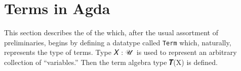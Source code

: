 \documentclass[a4paper,UKenglish,cleveref, autoref, thm-restate]{lipics-v2019}
\begin{document}

\section{Terms in Agda}\label{sec:terms-in-agda}
This section describes the \termsmodule of the \agdaualib which, after the usual assortment of preliminaries, begins by defining
a datatype called \texttt{Term} which, naturally, represents the type of terms. Type \ab 𝑋 : \ab 𝒰 ̇ is used to represent an arbitrary collection of ``variables.'' Then the term algebra type 𝑻(X) is defined.
\begin{code}\end{code}
\begin{code}\end{code}
\end{document}
